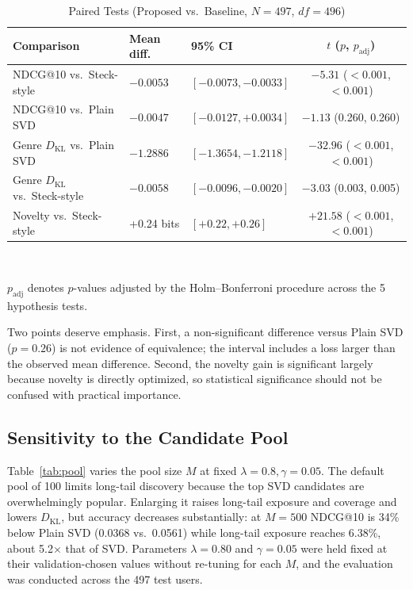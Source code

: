 \documentclass[conference]{IEEEtran}
\newcommand{\KL}{D_{\mathrm{KL}}}
\begin{document}
  \begin{table}[t]
  \centering
  \caption{Paired Tests (Proposed vs.\ Baseline, $N=497$, $df=496$)}
  \label{tab:stats}
  \renewcommand{\arraystretch}{1.1}
  \footnotesize
  \begin{tabular}{@{}p{2.0cm}p{1.1cm}p{2.2cm}c@{}}
  \toprule
  \textbf{Comparison} & \textbf{Mean diff.} & \textbf{95\% CI} & \textbf{$t$ ($p$, $p_{\mathrm{adj}}$)}\\
  \midrule
  NDCG@10 vs.\ Steck-style & $-0.0053$ & $[-0.0073,-0.0033]$ & $-5.31$ ($<0.001$, $<0.001$)\\
  NDCG@10 vs.\ Plain SVD & $-0.0047$ & $[-0.0127,+0.0034]$ & $-1.13$ (0.260, 0.260)\\
  Genre $\KL$ vs.\ Plain SVD & $-1.2886$ & $[-1.3654,-1.2118]$ & $-32.96$ ($<0.001$, $<0.001$)\\
  Genre $\KL$ vs.\ Steck-style & $-0.0058$ & $[-0.0096,-0.0020]$ & $-3.03$ (0.003, 0.005)\\
  Novelty vs.\ Steck-style & +0.24 bits & $[+0.22,+0.26]$ & $+21.58$ ($<0.001$, $<0.001$)\\
  \bottomrule
  \end{tabular}
  \\[2pt]
  \raggedright\scriptsize $p_{\mathrm{adj}}$ denotes $p$-values adjusted by the Holm--Bonferroni procedure across the 5 hypothesis tests.
  \end{table}

  Two points deserve emphasis. First, a non-significant difference versus Plain SVD ($p=0.26$) is not evidence of equivalence; the interval includes a loss larger than the observed mean difference. Second, the novelty gain is significant largely because novelty is directly optimized, so statistical significance should not be confused with practical importance.

  \subsection{Sensitivity to the Candidate Pool}
  Table~\ref{tab:pool} varies the pool size $M$ at fixed $\lambda=0.8,\gamma=0.05$. The default pool of 100 limits long-tail discovery because the top SVD candidates are overwhelmingly popular. Enlarging it raises long-tail exposure and coverage and lowers $\KL$, but accuracy decreases substantially: at $M=500$ NDCG@10 is 34\% below Plain SVD (0.0368 vs.\ 0.0561) while long-tail exposure reaches 6.38\%, about 5.2$\times$ that of SVD. Parameters $\lambda=0.80$ and $\gamma=0.05$ were held fixed at their validation-chosen values without re-tuning for each $M$, and the evaluation was conducted across the 497 test users.
\end{document}
